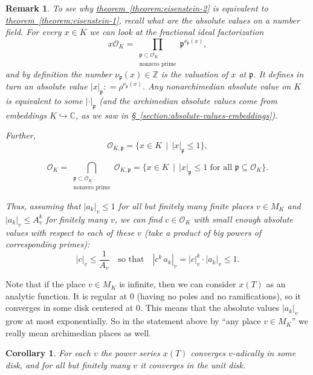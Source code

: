 \documentclass{article}
\newcommand{\dfn}{\mathrel{\mathop:}=}
\newcommand{\ZZ}{\mathbb{Z}}
\newcommand{\refref}[2]{\hyperref[#2]{#1~\ref*{#2}}}
\theoremstyle{myplain}
\newtheorem{corollary}[proposition]{Corollary}
\theoremstyle{mydefinition}
\newtheorem{remark}[proposition]{Remark}
\begin{document}
\begin{remark}
  To see why \refref{theorem}{theorem:eisenstein-2} is equivalent to
  \refref{theorem}{theorem:eisenstein-1}, recall what are the absolute values on
  a number field. For every $x \in K$ we can look at the \emph{fractional} ideal
  factorization
  $$x \mathcal{O}_K = \prod_{\substack{\mathfrak{p} \subset \mathcal{O}_K \\ \text{nonzero prime}}} \mathfrak{p}^{\nu_\mathfrak{p} (x)},$$
  and by definition the number $\nu_\mathfrak{p} (x) \in \ZZ$ is the
  \emph{valuation} of $x$ at $\mathfrak{p}$. It defines in turn an absolute
  value $|x|_\mathfrak{p} \dfn \rho^{\nu_\mathfrak{p} (x)}$. Any nonarchimedian
  absolute value on $K$ is equivalent to some $|\cdot|_\mathfrak{p}$ (and the
  archimedian absolute values come from embeddings
  $K \hookrightarrow \mathbb{C}$, as we saw in
  \refref{\S}{section:absolute-values-embeddings}).

  Further,
  \[ \mathcal{O}_{K,\mathfrak{p}} = \{ x\in K \,\mid\, |x|_\mathfrak{p} \le 1 \}, \]

  \[ \mathcal{O}_K = \bigcap_{\substack{\mathfrak{p} \subset \mathcal{O}_K \\ \text{nonzero prime}}} \mathcal{O}_{K,\mathfrak{p}} =
    \{ x\in K \,\mid\, |x|_\mathfrak{p} \le 1 \text{ for all } \mathfrak{p} \subseteq \mathcal{O}_K \}. \]

  Thus, assuming that $|a_k|_v \le 1$ for all but finitely many finite places
  $v\in M_K$ and $|a_k|_v \le A_v^k$ for \emph{finitely many} $v$, we can find
  $c \in \mathcal{O}_K$ with small enough absolute values with respect to each of these
  $v$ (take a product of big powers of corresponding primes):
  \[ |c|_v \le \frac{1}{A_v} \quad \text{so that} \quad |c^k \, a_k|_v = |c|_v^k \cdot |a_k|_v \le 1. \]
\end{remark}

Note that if the place $v \in M_K$ is infinite, then we can consider $x (T)$ as
an analytic function. It is regular at $0$ (having no poles and no
ramifications), so it converges in some disk centered at $0$. This means that
the absolute values $|a_k|_v$ grow at most exponentially. So in the statement
above by ``any place $v \in M_K$'' we really mean archimedian places as well.

\begin{corollary}
  For each $v$ the power series $x (T)$ converges $v$-adically in \emph{some}
  disk, and for all but finitely many $v$ it converges in the unit disk.
\end{corollary}
\end{document}

